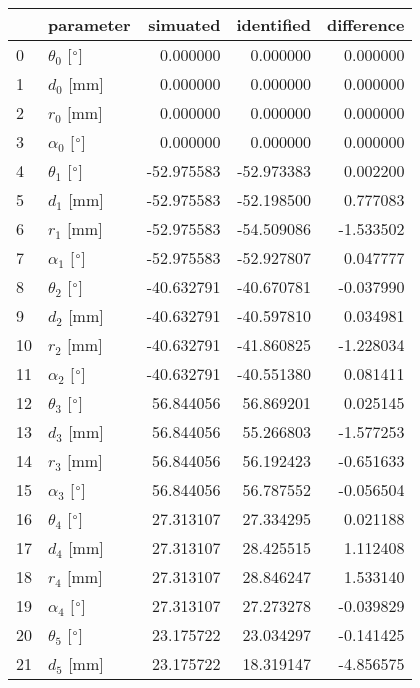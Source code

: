 \documentclass{standalone}%
\begin{document}
%
\normalsize%
\begin{tabular}{llrrr}
\toprule
{} &                 parameter &   simuated & identified & difference \\
\midrule
0  &  $\theta_{0}$ [$\degree$] &   0.000000 &   0.000000 &   0.000000 \\
1  &              $d_{0}$ [mm] &   0.000000 &   0.000000 &   0.000000 \\
2  &              $r_{0}$ [mm] &   0.000000 &   0.000000 &   0.000000 \\
3  &  $\alpha_{0}$ [$\degree$] &   0.000000 &   0.000000 &   0.000000 \\
4  &  $\theta_{1}$ [$\degree$] & -52.975583 & -52.973383 &   0.002200 \\
5  &              $d_{1}$ [mm] & -52.975583 & -52.198500 &   0.777083 \\
6  &              $r_{1}$ [mm] & -52.975583 & -54.509086 &  -1.533502 \\
7  &  $\alpha_{1}$ [$\degree$] & -52.975583 & -52.927807 &   0.047777 \\
8  &  $\theta_{2}$ [$\degree$] & -40.632791 & -40.670781 &  -0.037990 \\
9  &              $d_{2}$ [mm] & -40.632791 & -40.597810 &   0.034981 \\
10 &              $r_{2}$ [mm] & -40.632791 & -41.860825 &  -1.228034 \\
11 &  $\alpha_{2}$ [$\degree$] & -40.632791 & -40.551380 &   0.081411 \\
12 &  $\theta_{3}$ [$\degree$] &  56.844056 &  56.869201 &   0.025145 \\
13 &              $d_{3}$ [mm] &  56.844056 &  55.266803 &  -1.577253 \\
14 &              $r_{3}$ [mm] &  56.844056 &  56.192423 &  -0.651633 \\
15 &  $\alpha_{3}$ [$\degree$] &  56.844056 &  56.787552 &  -0.056504 \\
16 &  $\theta_{4}$ [$\degree$] &  27.313107 &  27.334295 &   0.021188 \\
17 &              $d_{4}$ [mm] &  27.313107 &  28.425515 &   1.112408 \\
18 &              $r_{4}$ [mm] &  27.313107 &  28.846247 &   1.533140 \\
19 &  $\alpha_{4}$ [$\degree$] &  27.313107 &  27.273278 &  -0.039829 \\
20 &  $\theta_{5}$ [$\degree$] &  23.175722 &  23.034297 &  -0.141425 \\
21 &              $d_{5}$ [mm] &  23.175722 &  18.319147 &  -4.856575 \\

\end{tabular}
\end{document}
